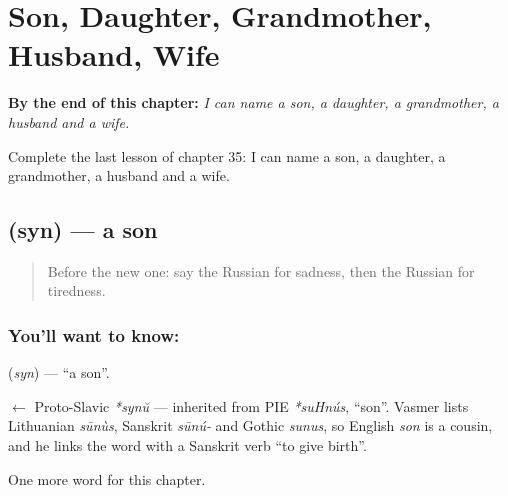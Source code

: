 
\chapter{Son, Daughter, Grandmother, Husband, Wife}
\label{ch:ru-son-daughter-grandmother-husband-wife}

\begin{chapteropening}
\textbf{By the end of this chapter:} \emph{I can name a son, a daughter, a grandmother, a husband and a wife.}

Complete the last lesson of chapter 35: I can name a son, a daughter, a grandmother, a husband and a wife.
\end{chapteropening}

\section[\texorpdfstring{\ru{сын} (syn)}{сын (syn)}]{ (syn) — a son}

\label{lesson:RU-C35-son}



\begin{quote}
Before the new one: say the Russian for sadness, then the Russian for tiredness.
\end{quote}

\subsection*{You'll want to know: }
\textbf{} (\emph{syn}) — \textquotedblleft{}a son\textquotedblright{}.

\begin{cousinweb}
\textbf{} $\leftarrow$ Proto-Slavic \emph{*synŭ} — inherited from PIE \emph{*suHnús}, \textquotedblleft{}son\textquotedblright{}. Vasmer lists Lithuanian \emph{sūnùs}, Sanskrit \emph{sūnú-} and Gothic \emph{sunus}, so English \emph{son} is a cousin, and he links the word with a Sanskrit verb \textquotedblleft{}to give birth\textquotedblright{}.
\end{cousinweb}

\begin{grammarlens}[title={What you've built}]
One more word for this chapter.
\end{grammarlens}

